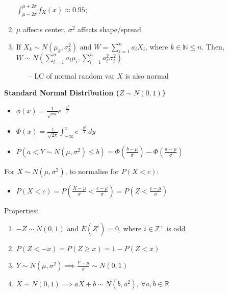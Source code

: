 \documentclass[a4paper, 12pt]{article}
\begin{document}
\begin{multicols*}{4}
\begin{enumerate}
        $\int_{\mu-2\sigma}^{\mu+2\sigma}f_X(x) \approx 0.95$;
    \item $\mu$ affects center, $\sigma^2$ affects shape/spread
    \item If $X_k \sim N(\mu_k,\sigma_k^2)$ and $W=\sum_{i=1}^na_iX_i$, where $k\in \mathbb{N}\leq n$. Then, $W\sim N(\sum_{i=1}^na_i\mu_i,\sum_{i=1}^na_i^2\sigma_i^2)$
    \begin{itemize}
        \item[--] LC of normal random var $X$ is also normal
    \end{itemize}
\end{enumerate}
\textbf{Standard Normal Distribution ($Z \sim N(0,1)$)} \\
\begin{minipage}{.43\linewidth}
    \begin{itemize}
        \item $\phi(x) = \frac{1}{\sqrt{s\pi}}e^{-\frac{x^2}{2}}$
    \end{itemize}
\end{minipage}
\begin{minipage}{.56\linewidth}
    \begin{itemize}
        \item $\Phi(x) = \frac{1}{\sqrt{2\pi}}\int^x_{-\infty}e^{-\frac{y^2}{2}} \, dy$
    \end{itemize}
\end{minipage}
\begin{itemize}
    \item $P(a < Y \sim N(\mu,\sigma^2) \leq b) = \Phi(\frac{b-\mu}{\sigma}) - \Phi(\frac{a-\mu}{\sigma})$
\end{itemize}
For $X \sim N(\mu,\sigma^2)$, to normalise for $P(X < c)$:
\begin{itemize}
    \item $P(X<c) = P(\frac{X-\mu}{\sigma}<\frac{c-\mu}{\sigma}) = P(Z<\frac{c-\mu}{\sigma})$
\end{itemize}
Properties:
\begin{enumerate}
    \item $-Z \sim N(0,1)$ and $E(Z^i) = 0$, where $i \in \mathbb{Z^+}$ is odd
    \item $P(Z < -x) = P(Z \geq x) = 1 - P(Z<x)$
    \item $Y \sim N(\mu, \sigma^2) \implies \frac{Y-\mu}{\sigma}\sim N(0,1)$
    \item $X \sim N(0, 1) \implies aX + b \sim N(b, a^2), \, \forall a,b \in \mathbb{R}$
\end{enumerate}


\end{multicols*}
\end{document}
